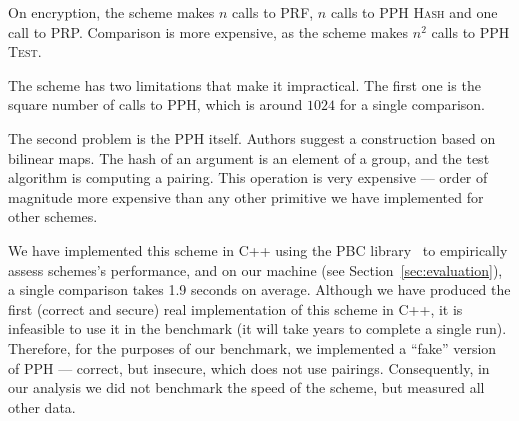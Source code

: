 		On encryption, the scheme makes $n$ calls to PRF, $n$ calls to PPH \textsc{Hash} and one call to PRP\@.
		Comparison is more expensive, as the scheme makes $n^2$ calls to PPH \textsc{Test}.

		The scheme has two limitations that make it impractical.
		The first one is the square number of calls to PPH, which is around $1024$ for a single comparison.

		The second problem is the PPH itself.
		Authors suggest a construction based on bilinear maps.
		The hash of an argument is an element of a group, and the test algorithm is computing a pairing.
		This operation is very expensive --- order of magnitude more expensive than any other primitive we have implemented for other schemes.

		We have implemented this scheme in C++ using the PBC library~\cite{pbc} to empirically assess schemes's performance, and on our machine (see Section~\ref{sec:evaluation}), a single comparison takes 1.9 seconds on average.
		Although we have produced the first (correct and secure) real implementation of this scheme in C++, it is infeasible to use it in the benchmark (it will take years to complete a single run).
		Therefore, for the purposes of our benchmark, we implemented a ``fake'' version of PPH --- correct, but insecure, which does not use pairings.
		Consequently, in our analysis we did not benchmark the speed of the scheme, but measured all other data.
